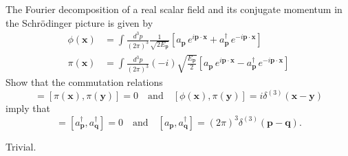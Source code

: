 The Fourier decomposition of a real scalar field and its conjugate momentum in the Schrödinger picture is given by
\begin{align}
    \phi(\mathbf{x}) &= \int \frac{d^3p}{(2\pi)^3}\frac{1}{\sqrt{2E_{\mathbf{p}}}}\left[a_{\mathbf{p}}\,e^{i\mathbf{p}\cdot\mathbf{x}} + a_{\mathbf{p}}^\dagger\,e^{-i\mathbf{p}\cdot\mathbf{x}}\right] \\
    \pi(\mathbf{x}) &= \int \frac{d^3p}{(2\pi)^3}(-i)\sqrt{\frac{E_{\mathbf{p}}}{2}}\left[a_{\mathbf{p}}\,e^{i\mathbf{p}\cdot\mathbf{x}} - a_{\mathbf{p}}^\dagger\,e^{-i\mathbf{p}\cdot\mathbf{x}}\right]
\end{align}
Show that the commutation relations
\begin{equation}
    [\phi(\mathbf{x}),\phi(\mathbf{y})] = [\pi(\mathbf{x}),\pi(\mathbf{y})] = 0 \quad \text{and} \quad [\phi(\mathbf{x}),\pi(\mathbf{y})] = i\delta^{(3)}(\mathbf{x}-\mathbf{y})
\end{equation}
imply that
\begin{equation}
    [a_{\mathbf{p}}, a_{\mathbf{q}}] = [a_{\mathbf{p}}^\dagger, a_{\mathbf{q}}^\dagger] = 0 \quad \text{and} \quad [a_{\mathbf{p}}, a_{\mathbf{q}}^\dagger] = (2\pi)^3\delta^{(3)}(\mathbf{p}-\mathbf{q}).
\end{equation}
\begin{solution}
    Trivial.
\end{solution}
